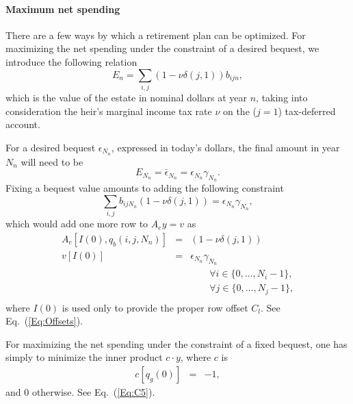 \documentclass{report}[fleqn,12pt]
\begin{document}
\paragraph*{Maximum net spending}
There are a few ways by which a retirement plan can be optimized. For maximizing the net spending under
the constraint of a desired bequest, we introduce the following relation
\begin{equation}
	\label{Eq:Bequest}
	E_n = \sum_{i,j} (1 - \nu\delta(j, 1)) b_{ijn},
\end{equation}
which is the value of the estate in nominal dollars at year $n$,
taking into consideration the heir's marginal income tax rate $\nu$ on the ($j=1$) tax-deferred account. 

For a desired bequest $\epsilon_{N_n}$, expressed in today's
dollars, the final amount in year $N_n$ will need to be
\begin{equation}
	E_{N_n} = \bar\epsilon_{N_n} = \epsilon_{N_n} \gamma_{N_n}.
\end{equation}
Fixing a bequest value amounts to adding the following constraint
\begin{equation}
	\sum_{i,j} b_{ijN_n} (1 - \nu\delta(j, 1)) = \epsilon_{N_n} \gamma_{N_n},
\end{equation}
which would add one more row to $A_ey = v$ as
\begin{eqnarray}
	A_e[I(0), q_b(i, j, N_n)] &=& (1 - \nu\delta(j, 1)) \nonumber \\
	v[I(0)] &=& \epsilon_{N_n}\gamma_{N_n} \\
	&&\qquad\forall i \in \{0,\ldots, N_i-1\},\nonumber\\
	&&\qquad\forall j \in \{0,\ldots, N_j-1\},\nonumber\\
\end{eqnarray}
where $I(0)$ is used only to provide the proper row offset $C_l$. See Eq.~(\ref{Eq:Offsets}).

For maximizing the net spending under the constraint of a fixed bequest, one has simply to
minimize the inner product $c\cdot y$, where $c$ is
\begin{eqnarray}
	c[q_g(0)] &=& -1,
\end{eqnarray}
and 0 otherwise. See Eq.~(\ref{Eq:C5}).
\end{document}
